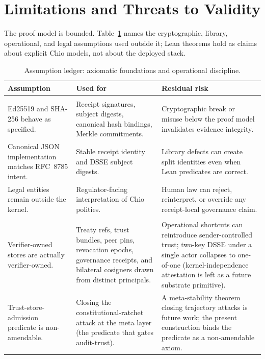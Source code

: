 \section{Limitations and Threats to Validity}
\label{sec:limits}

The proof model is bounded. Table~\ref{tab:assumptions} names the cryptographic, library, operational, and legal assumptions used outside it; Lean theorems hold as claims about explicit Chio models, not about the deployed stack.

\begin{table}[t]
\caption{Assumption ledger: axiomatic foundations and operational discipline.}
\label{tab:assumptions}
\scriptsize
\begin{tabularx}{\textwidth}{@{}>{\raggedright\arraybackslash}p{}>{\raggedright\arraybackslash}p{}>{\raggedright\arraybackslash}X@{}}
\toprule
Assumption & Used for & Residual risk \\
\midrule
\multicolumn{3}{@{}l}{\textit{Foundational (cryptographic / library / legal)}} \\
Ed25519 and SHA-256 behave as specified. & Receipt signatures, subject digests, canonical hash bindings, Merkle commitments. & Cryptographic break or misuse below the proof model invalidates evidence integrity. \\
Canonical JSON implementation matches RFC~8785 intent. & Stable receipt identity and DSSE subject digests. & Library defects can create split identities even when Lean predicates are correct. \\
Legal entities remain outside the kernel. & Regulator-facing interpretation of Chio polities. & Human law can reject, reinterpret, or override any receipt-local governance claim. \\
\midrule
\multicolumn{3}{@{}l}{\textit{Operational discipline (failure modes are policy violations, not breaks)}} \\
Verifier-owned stores are actually verifier-owned. & Treaty refs, trust bundles, peer pins, revocation epochs, governance receipts, and bilateral cosigners drawn from distinct principals. & Operational shortcuts can reintroduce sender-controlled trust; two-key DSSE under a single actor collapses to one-of-one (kernel-independence attestation is left as a future substrate primitive). \\
Trust-store-admission predicate is non-amendable. & Closing the constitutional-ratchet attack at the meta layer (the predicate that gates audit-trust). & A meta-stability theorem closing trajectory attacks is future work; the present construction binds the predicate as a non-amendable axiom. \\

\end{tabularx}
\end{table}
